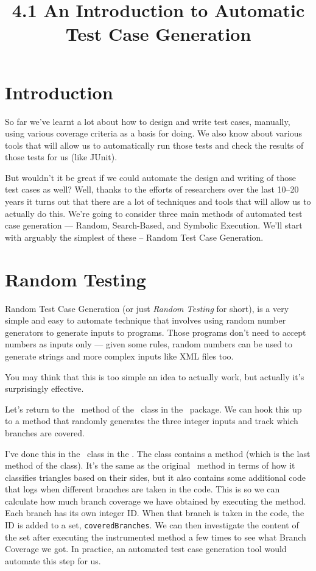 



\title{4.1 An Introduction to Automatic Test Case Generation}

\section{Introduction}

So far we've learnt a lot about how to design and write test cases, manually, using
various coverage criteria as a basis for doing. We also know about various tools
that will allow us to automatically run those tests and check the results of
those tests for us (like JUnit). 

But wouldn't it be great if we could automate the design and writing of those
test cases as well? Well, thanks to the efforts of researchers over the last
10--20 years it turns out that there are a lot of techniques and tools that will
allow us to actually do this. We're going to consider three main methods of
automated test case generation --- Random, Search-Based, and Symbolic Execution.
We'll start with arguably the simplest of these -- Random Test Case Generation.


\section{Random Testing}

Random Test Case Generation (or just {\it Random Testing} for short), is a very
simple and easy to automate technique that involves using random number
generators to generate inputs to programs. Those programs don't need to accept
numbers as inputs only --- given some rules, random numbers can be used to
generate strings and more complex inputs like XML files too.

You may think that this is too simple an idea to actually work, but actually
it's surprisingly effective. 


Let's return to the \classifymethod~method of the \triangleclass~class in the
\lecturespackage~package. We can hook this up to a method that randomly
generates the three integer inputs and track which branches are covered. 

I've done this in the \randomlytesttriangleclass~class in the
\lecturesexecutionpackage. The class contains a method
\instrumentedclassifymethod (which is the last method of the class). It's the
same as the original \classifymethod~method in terms of how it classifies
triangles based on their sides, but it also contains some additional code that
logs when different branches are taken in the code. This is so we can calculate
how much branch coverage we have obtained by executing the method. Each branch
has its own integer ID. When that branch is taken in the code, the ID is added
to a set, {\tt coveredBranches}. We can then investigate the content of the set
after executing the instrumented method a few times to see what Branch Coverage
we got. In practice, an automated test case generation tool would automate this
step for us.

